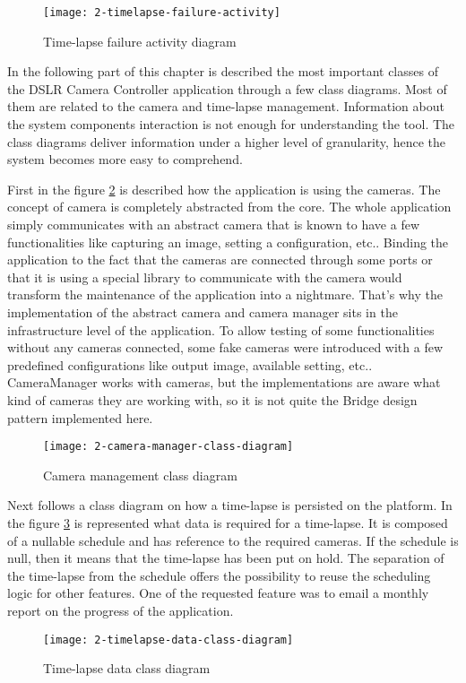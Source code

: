 \begin{figure}[!ht]
\centering
\texttt{[image: 2-timelapse-failure-activity]}
\caption{Time-lapse failure activity diagram}\label{timelapse_failure_activity}
\end{figure}

In the following part of this chapter is described the most important classes of the DSLR Camera Controller application through a few class diagrams. Most of them are related to the camera and time-lapse management. Information about the system components interaction is not enough for understanding the tool. The class diagrams deliver information under a higher level of granularity, hence the system becomes more easy to comprehend.

First in the figure \mbox{\ref{camera_manager_class_diagram}} is described how the application is using the cameras. The concept of camera is completely abstracted from the core. The whole application simply communicates with an abstract camera that is known to have a few functionalities like capturing an image, setting a configuration, etc.. Binding the application to the fact that the cameras are connected through some ports or that it is using a special library to communicate with the camera would transform the maintenance of the application into a nightmare. That's why the implementation of the abstract camera and camera manager sits in the infrastructure level of the application. To allow testing of some functionalities without any cameras connected, some fake cameras were introduced with a few predefined configurations like output image, available setting, etc.. CameraManager works with cameras, but the implementations are aware what kind of cameras they are working with, so it is not quite the Bridge design pattern implemented here.

\begin{figure}[!ht]
\centering
\texttt{[image: 2-camera-manager-class-diagram]}
\caption{Camera management class diagram}\label{camera_manager_class_diagram}
\end{figure}

Next follows a class diagram on how a time-lapse is persisted on the platform. In the figure \mbox{\ref{timelapse_data_class_diagram}} is represented what data is required for a time-lapse. It is composed of a nullable schedule and has reference to the required cameras. If the schedule is null, then it means that the time-lapse has been put on hold. The separation of the time-lapse from the schedule offers the possibility to reuse the scheduling logic for other features. One of the requested feature was to email a monthly report on the progress of the application.

\begin{figure}[!ht]
\centering
\texttt{[image: 2-timelapse-data-class-diagram]}
\caption{Time-lapse data class diagram}\label{timelapse_data_class_diagram}
\end{figure}
